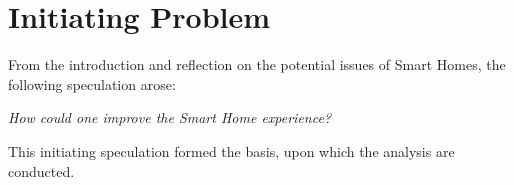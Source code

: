 \section{Initiating Problem} \label{sec:initiating-problem}
From the introduction and reflection on the potential issues of Smart Homes, the following speculation arose: 

\begin{changemargin}{0.5cm}{0.5cm} 
\textit{How could one improve the Smart Home experience?}
\end{changemargin} 

This initiating speculation formed the basis, upon which the analysis are conducted.
